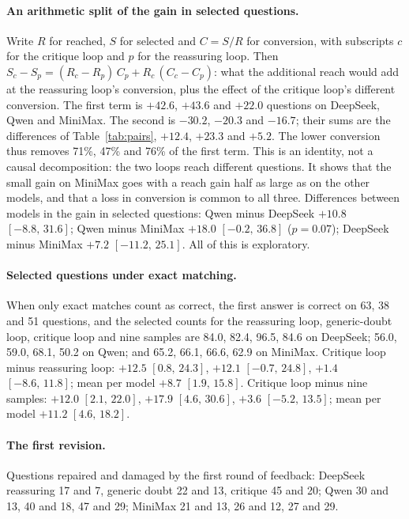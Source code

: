 \documentclass[11pt]{article}
\newcommand{\ds}{DeepSeek}
\newcommand{\qw}{Qwen}
\newcommand{\mm}{MiniMax}
\newcommand{\ci}[2]{$[#1,\,#2]$}
\begin{document}
\paragraph{An arithmetic split of the gain in selected questions.}
Write $R$ for reached, $S$ for selected and $C=S/R$ for conversion, with subscripts $c$ for the critique loop and $p$ for the reassuring loop.
Then $S_c-S_p=(R_c-R_p)\,C_p+R_c\,(C_c-C_p)$: what the additional reach would add at the reassuring loop's conversion, plus the effect of the critique loop's different conversion.
The first term is $+42.6$, $+43.6$ and $+22.0$ questions on \ds, \qw{} and \mm. The second is $-30.2$, $-20.3$ and $-16.7$; their sums are the differences of Table~\ref{tab:pairs}, $+12.4$, $+23.3$ and $+5.2$.
The lower conversion thus removes 71\%, 47\% and 76\% of the first term.
This is an identity, not a causal decomposition: the two loops reach different questions.
It shows that the small gain on \mm{} goes with a reach gain half as large as on the other models, and that a loss in conversion is common to all three.
Differences between models in the gain in selected questions: \qw{} minus \ds{} $+10.8$ \ci{-8.8}{31.6}; \qw{} minus \mm{} $+18.0$ \ci{-0.2}{36.8} ($p=0.07$); \ds{} minus \mm{} $+7.2$ \ci{-11.2}{25.1}.
All of this is exploratory.

\paragraph{Selected questions under exact matching.}
When only exact matches count as correct, the first answer is correct on 63, 38 and 51 questions, and the selected counts for the reassuring loop, generic-doubt loop, critique loop and nine samples are 84.0, 82.4, 96.5, 84.6 on \ds; 56.0, 59.0, 68.1, 50.2 on \qw; and 65.2, 66.1, 66.6, 62.9 on \mm.
Critique loop minus reassuring loop: $+12.5$ \ci{0.8}{24.3}, $+12.1$ \ci{-0.7}{24.8}, $+1.4$ \ci{-8.6}{11.8}; mean per model $+8.7$ \ci{1.9}{15.8}.
Critique loop minus nine samples: $+12.0$ \ci{2.1}{22.0}, $+17.9$ \ci{4.6}{30.6}, $+3.6$ \ci{-5.2}{13.5}; mean per model $+11.2$ \ci{4.6}{18.2}.

\paragraph{The first revision.}
Questions repaired and damaged by the first round of feedback: \ds{} reassuring 17 and 7, generic doubt 22 and 13, critique 45 and 20; \qw{} 30 and 13, 40 and 18, 47 and 29; \mm{} 21 and 13, 26 and 12, 27 and 29.
\end{document}
